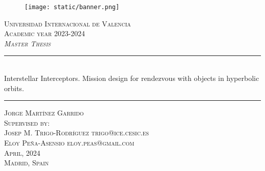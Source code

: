 \begin{titlepage}

  \begin{center}

    \begin{figure}[h]
      \centering
      \texttt{[image: static/banner.png]}
    \end{figure}
    \vspace{1cm}


    \textsc{\large
      Universidad Internacional de Valencia
    }\\[0.25cm]
    \textsc{\large
      Academic year 2023-2024
    }\\[1.5cm]
    \textsc{\large
      \textit{Master Thesis}
    }\\[1.75cm]

    \noindent\rule{\textwidth}{1pt}
    \\[0.25cm]
    {
    \fontsize{35pt}{35pt}\selectfont
    {
      Interstellar Interceptors. Mission design for rendezvous with objects in hyperbolic orbits.
    }
    }
    \noindent\rule{\textwidth}{1pt}

    \vspace{1.5cm}
    \textsc{\Large
      Jorge Martínez Garrido
    }\\[2cm]
    \textsc{\large
      Supervised by:
    }\\[0.25cm]
    \textsc{\large
     Josep M. Trigo-Rodríguez trigo@ice.cesic.es \\
     Eloy Peña-Asensio eloy.peas@gmail.com
    }\\[3cm]

    \textsc{\large
       April, 2024
    }\\[0.25cm]
    \textsc{\large
       Madrid, Spain
    }\\[0.25cm]

  \end{center}
\end{titlepage}

